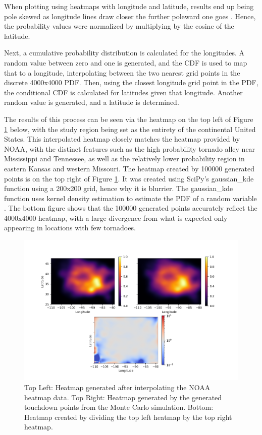 \documentclass[12pt]{article}
\begin{document}
When plotting using heatmaps with longitude and latitude, results end up being pole skewed as longitude lines draw closer the further poleward one goes \cite{strader}. Hence, the probability values were normalized by multiplying by the cosine of the latitude. \par
Next, a cumulative probability distribution is calculated for the longitudes. A random value between zero and one is generated, and the CDF is used to map that to a longitude, interpolating between the two nearest grid points in the discrete 4000x4000 PDF. Then, using the closest longitude grid point in the PDF, the conditional CDF is calculated for latitudes given that longitude. Another random value is generated, and a latitude is determined. \par
The results of this process can be seen via the heatmap on the top left of Figure \ref{fig:heatmapresults} below, with the study region being set as the entirety of the continental United States. This interpolated heatmap closely matches the heatmap provided by NOAA, with the distinct features such as the high probability tornado alley near Mississippi and Tennessee, as well as the relatively lower probability region in eastern Kansas and western Missouri. The heatmap created by 100000 generated points is on the top right of Figure \ref{fig:heatmapresults}. It was created using SciPy’s gaussian\_kde function using a 200x200 grid, hence why it is blurrier. The gaussian\_kde function uses kernel density estimation to estimate the PDF of a random variable \cite{scipy}. The bottom figure shows that the 100000 generated points accurately reflect the 4000x4000 heatmap, with a large divergence from what is expected only appearing in locations with few tornadoes. \par
\begin{figure}[ht]
    \centering %
    \includegraphics[width=\textwidth]{heatmapresults.png}
    \caption[Generated and simulated tornado heatmaps over the continental U.S]{Top Left: Heatmap generated after interpolating the NOAA heatmap data. Top Right: Heatmap generated by the generated touchdown points from the Monte Carlo simulation. Bottom: Heatmap created by dividing the top left heatmap by the top right heatmap.}
    \label{fig:heatmapresults}
\end{figure}
\end{document}
